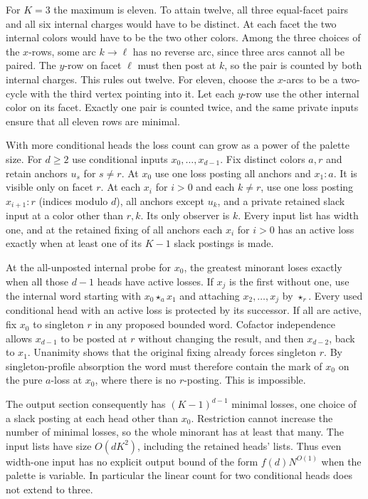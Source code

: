 For $K=3$ the maximum is eleven. To attain twelve,
all three equal-facet pairs and all six internal
charges would have to be distinct. At each facet
the two internal colors would have to be the
two other colors. Among the three choices of
the $x$-rows, some arc $k\to\ell$ has no
reverse arc, since three arcs cannot all be
paired. The $y$-row on facet $\ell$ must then
post at $k$, so the pair is counted by both
internal charges. This rules out twelve.
For eleven, choose the $x$-arcs to be a
two-cycle with the third vertex pointing
into it. Let each $y$-row use the other
internal color on its facet. Exactly one
pair is counted twice, and the same private
inputs ensure that all eleven rows are minimal.

With more conditional heads the loss count can
grow as a power of the palette size. For $d\geq2$
use conditional inputs $x_0,\ldots,x_{d-1}$.
Fix distinct colors $a,r$ and retain anchors
$u_s$ for $s\ne r$. At $x_0$ use one loss
posting all anchors and $x_1:a$. It is visible
only on facet $r$. At each $x_i$ for $i>0$
and each $k\ne r$, use one loss posting
$x_{i+1}:r$ (indices modulo $d$), all anchors
except $u_k$, and a private retained slack
input at a color other than $r,k$. Its only
observer is $k$. Every input list has width
one, and at the retained fixing of all anchors
each $x_i$ for $i>0$ has an active loss
exactly when at least one of its $K-1$
slack postings is made.

At the all-unposted internal probe for $x_0$,
the greatest minorant loses exactly when
all those $d-1$ heads have active losses.
If $x_j$ is the first without one, use the
internal word starting with $x_0\star_a x_1$
and attaching $x_2,\ldots,x_j$ by $\star_r$.
Every used conditional head with an active
loss is protected by its successor. If all
are active, fix $x_0$ to singleton $r$ in
any proposed bounded word. Cofactor
independence allows $x_{d-1}$ to be posted
at $r$ without changing the result, and
then $x_{d-2}$, back to $x_1$. Unanimity
shows that the original fixing already
forces singleton $r$. By singleton-profile
absorption the word must therefore contain
the mark of $x_0$ on the pure $a$-loss
at $x_0$, where there is no $r$-posting.
This is impossible.

The output section consequently has
$(K-1)^{d-1}$ minimal losses, one choice
of a slack posting at each head other than
$x_0$. Restriction cannot increase the
number of minimal losses, so the whole
minorant has at least that many. The input
lists have size $O(dK^2)$, including the
retained heads' lists. Thus even width-one
input has no explicit
output bound of the form $f(d)N^{O(1)}$
when the palette is variable. In particular
the linear count for two conditional
heads does not extend to three.

